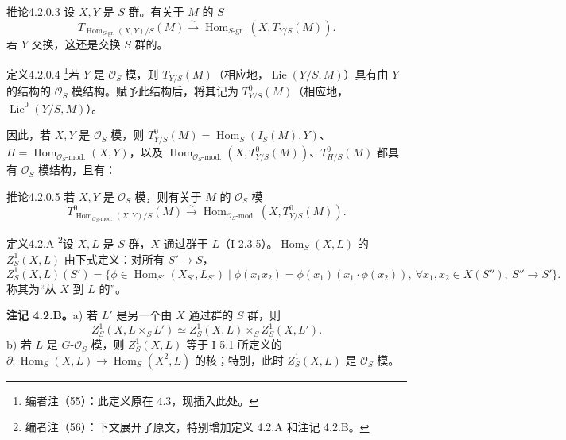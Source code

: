 \begin{SGAresult}{推论}{4.2.0.3}
设 $X,Y$ 是 $S$ 群。有关于 $M$ 的 $S$ 
\[T_{\operatorname{Hom}_{S\text{-gr.}}(X,Y)/S}(M)\xrightarrow{\sim}\operatorname{Hom}_{S\text{-gr.}}(X,T_{Y/S}(M)).\]
若 $Y$ 交换，这还是交换 $S$ 群的。
\end{SGAresult}
\begin{SGAresult}{定义}{4.2.0.4}
\footnote{编者注（55）：此定义原在 4.3，现插入此处。}若 $Y$ 是 $\mathcal O_S$ 模，则 $T_{Y/S}(M)$（相应地，$\operatorname{Lie}(Y/S,M)$）具有由 $Y$ 的结构的 $\mathcal O_S$ 模结构。赋予此结构后，将其记为 $T^0_{Y/S}(M)$（相应地，$\operatorname{Lie}^0(Y/S,M)$）。
\end{SGAresult}
因此，若 $X,Y$ 是 $\mathcal O_S$ 模，则 $T^0_{Y/S}(M)=\operatorname{Hom}_S(I_S(M),Y)$、$H=\operatorname{Hom}_{\mathcal O_S\text{-mod.}}(X,Y)$，以及 $\operatorname{Hom}_{\mathcal O_S\text{-mod.}}(X,T^0_{Y/S}(M))$、$T^0_{H/S}(M)$ 都具有 $\mathcal O_S$ 模结构，且有：
\begin{SGAresult}{推论}{4.2.0.5}
若 $X,Y$ 是 $\mathcal O_S$ 模，则有关于 $M$ 的 $\mathcal O_S$ 模
\[T^0_{\operatorname{Hom}_{\mathcal O_S\text{-mod.}}(X,Y)/S}(M)\xrightarrow{\sim}\operatorname{Hom}_{\mathcal O_S\text{-mod.}}(X,T^0_{Y/S}(M)).\]
\end{SGAresult}
\begin{SGAresult}{定义}{4.2.A}
\footnote{编者注（56）：下文展开了原文，特别增加定义 4.2.A 和注记 4.2.B。}设 $X,L$ 是 $S$ 群，$X$ 通过群于 $L$（I 2.3.5）。$\operatorname{Hom}_S(X,L)$ 的 $Z^1_S(X,L)$ 由下式定义：对所有 $S'\to S$，
\[Z^1_S(X,L)(S')=\{\phi\in\operatorname{Hom}_{S'}(X_{S'},L_{S'})\mid\phi(x_1x_2)=\phi(x_1)(x_1\cdot\phi(x_2)),\ \forall x_1,x_2\in X(S''),\ S''\to S'\}.\]
称其为“从 $X$ 到 $L$ 的”。
\end{SGAresult}
\textbf{注记 4.2.B。}a) 若 $L'$ 是另一个由 $X$ 通过群的 $S$ 群，则
\[Z^1_S(X,L\times_SL')\simeq Z^1_S(X,L)\times_SZ^1_S(X,L').\]
b) 若 $L$ 是 $G$-$\mathcal O_S$ 模，则 $Z^1_S(X,L)$ 等于 I 5.1 所定义的 $\partial:\operatorname{Hom}_S(X,L)\to\operatorname{Hom}_S(X^2,L)$ 的核；特别，此时 $Z^1_S(X,L)$ 是 $\mathcal O_S$ 模。

